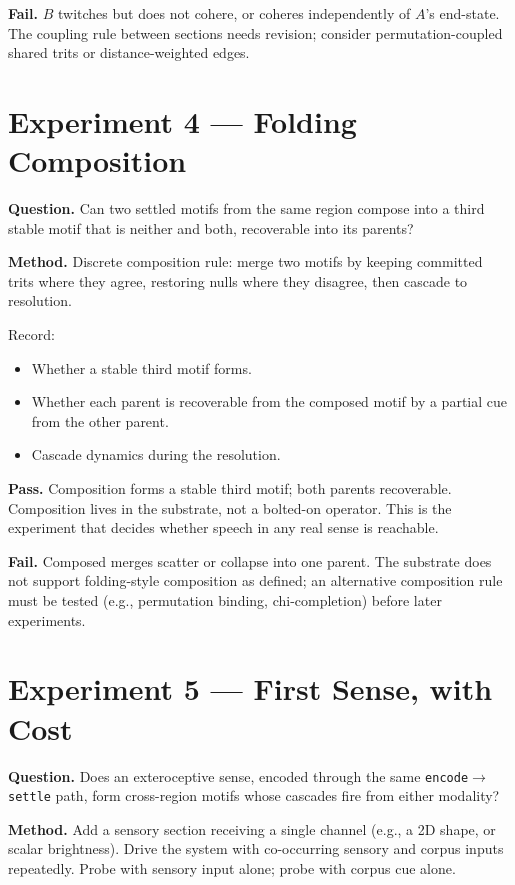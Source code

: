 \documentclass[11pt]{article}
\begin{document}
\textbf{Fail.} $B$ twitches but does not cohere, or coheres
independently of $A$'s end-state. The coupling rule between sections
needs revision; consider permutation-coupled shared trits or
distance-weighted edges.

\section{Experiment 4 --- Folding Composition}

\textbf{Question.} Can two settled motifs from the same region
compose into a third stable motif that is neither and both,
recoverable into its parents?

\textbf{Method.} Discrete composition rule: merge two motifs by
keeping committed trits where they agree, restoring nulls where
they disagree, then cascade to resolution.

Record:
\begin{itemize}
\item Whether a stable third motif forms.
\item Whether each parent is recoverable from the composed motif by a
      partial cue from the other parent.
\item Cascade dynamics during the resolution.
\end{itemize}

\textbf{Pass.} Composition forms a stable third motif; both parents
recoverable. Composition lives in the substrate, not a bolted-on
operator. This is the experiment that decides whether speech in any
real sense is reachable.

\textbf{Fail.} Composed merges scatter or collapse into one parent.
The substrate does not support folding-style composition as defined;
an alternative composition rule must be tested (e.g., permutation
binding, chi-completion) before later experiments.

\section{Experiment 5 --- First Sense, with Cost}

\textbf{Question.} Does an exteroceptive sense, encoded through the
same \texttt{encode}$\to$\texttt{settle} path, form cross-region motifs
whose cascades fire from either modality?

\textbf{Method.} Add a sensory section receiving a single channel
(e.g., a 2D shape, or scalar brightness). Drive the system with
co-occurring sensory and corpus inputs repeatedly. Probe with sensory
input alone; probe with corpus cue alone.
\end{document}
